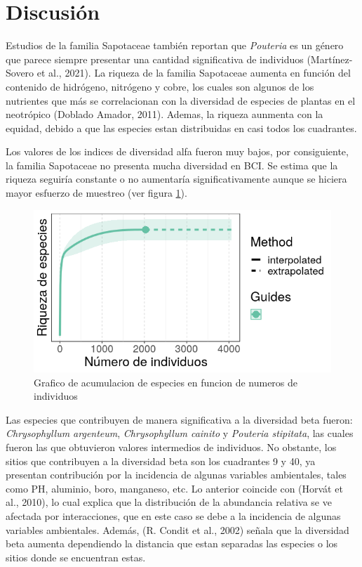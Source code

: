 \documentclass[11pt,]{article}
\begin{document}
\section{Discusión}\label{discusiuxf3n}

Estudios de la familia Sapotaceae también reportan que \emph{Pouteria}
es un género que parece siempre presentar una cantidad significativa de
individuos (Martínez-Sovero et al., 2021). La riqueza de la familia
Sapotaceae aumenta en función del contenido de hidrógeno, nitrógeno y
cobre, los cuales son algunos de los nutrientes que más se correlacionan
con la diversidad de especies de plantas en el neotrópico (Doblado
Amador, 2011). Ademas, la riqueza aunmenta con la equidad, debido a que
las especies estan distribuidas en casi todos los cuadrantes.

Los valores de los indices de diversidad alfa fueron muy bajos, por
consiguiente, la familia Sapotaceae no presenta mucha diversidad en BCI.
Se estima que la riqueza seguiría constante o no aumentaría
significativamente aunque se hiciera mayor esfuerzo de muestreo (ver
figura \ref{fig:acumulacion_especies_individuos}).

\begin{figure}
\centering
\includegraphics{acumulacion_especies_individuos.png}
\caption{Grafico de acumulacion de especies en funcion de numeros de
individuos \label{fig:acumulacion_especies_individuos}}
\end{figure}

Las especies que contribuyen de manera significativa a la diversidad
beta fueron: \emph{Chrysophyllum argenteum}, \emph{Chrysophyllum
cainito} y \emph{Pouteria stipitata}, las cuales fueron las que
obtuvieron valores intermedios de individuos. No obstante, los sitios
que contribuyen a la diversidad beta son los cuadrantes 9 y 40, ya
presentan contribución por la incidencia de algunas variables
ambientales, tales como PH, aluminio, boro, manganeso, etc. Lo anterior
coincide con (Horvát et al., 2010), lo cual explica que la distribución
de la abundancia relativa se ve afectada por interacciones, que en este
caso se debe a la incidencia de algunas variables ambientales. Además,
(R. Condit et al., 2002) señala que la diversidad beta aumenta
dependiendo la distancia que estan separadas las especies o los sitios
donde se encuentran estas.
\end{document}
